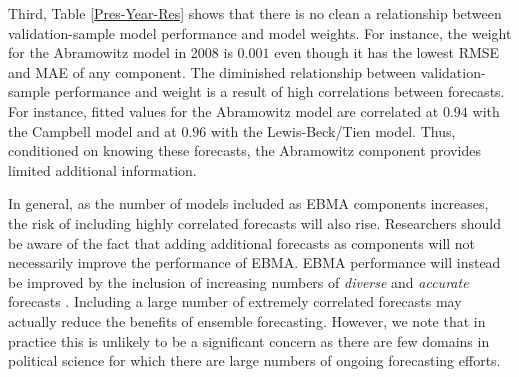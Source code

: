  Third, Table \ref{Pres-Year-Res} shows that there is no clean a
 relationship between validation-sample model performance and model
 weights. For instance, the weight for the Abramowitz model in 2008 is
 $0.001$ even though it has the lowest RMSE and MAE of any component.
 The diminished relationship between validation-sample performance and
 weight is a result of high correlations between forecasts.
For instance, fitted values for the Abramowitz model are correlated at
$0.94$ with the Campbell model and at $0.96$ with the Lewis-Beck/Tien
model. Thus, conditioned on knowing these forecasts, the Abramowitz
component provides limited additional information.  

In general, as the number of models included as EBMA components
increases, the risk of including highly correlated forecasts will also
rise.  Researchers should be aware of the fact that adding additional
forecasts as components will not necessarily improve the performance
of EBMA.  EBMA performance will instead be improved by the inclusion
of increasing numbers of \textit{diverse} and \textit{accurate}
forecasts \citep[see also,][]{Graefe:2010}.  Including a large number
of extremely correlated forecasts may actually reduce the benefits of
ensemble forecasting.  However, we note that in practice this is
unlikely to be a significant concern as there are few domains in
political science for which there are large numbers of ongoing
forecasting efforts.


